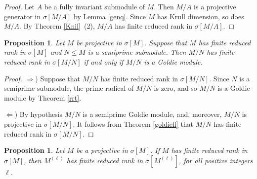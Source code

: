 \documentclass{amsart}
\newtheorem{prop}[thm]{Proposition}
\newtheorem{cor}[thm]{Corollary}
\theoremstyle{definition}
\newtheorem{example}[thm]{Example}
\theoremstyle{remark}
\numberwithin{equation}{section}
\newcommand{\sm}{\sigma[M]}
\begin{document}
	\begin{proof}
		Let $A$ be a fully invariant submodule of $M$. 
		Then $M/A$ is a projective generator in $\sigma[M/A]$ by Lemma \ref{genq}. 
		Since $M$ has Krull dimension, so does $M/A$. 
		By Theorem \ref{Knil}~(2), $M/A$ has finite reduced rank in $\sigma[M/A]$.
	\end{proof}
	
	
	
	
	\begin{prop}\label{rrq}
		Let $M$ be projective in $\sm$. 
		Suppose that $M$ has finite reduced rank in $\sm$ 
		and $N\leq M$ is a semiprime submodule. 
		Then $M/N$ has finite reduced rank in $\sigma[M/N]$ 
		if and only if $M/N$ is a Goldie module.
	\end{prop}
	
	\begin{proof}
		$\Rightarrow$) 
		Suppose that $M/N$ has finite reduced rank in $\sigma[M/N]$. 
		Since $N$ is a semiprime submodule, 
		the prime radical of $M/N$ is zero, 
		and so $M/N$ is a Goldie module by Theorem \ref{rrt}. 
		
		$\Leftarrow$) 
		By hypothesis $M/N$ is a semiprime Goldie module, 
		and, moreover, $M/N$ is projective in $\sigma[M/N]$. 
		It follows from Theorem \ref{goldiefl} that
		$M/N$ has finite reduced rank in $\sigma[M/N]$. 
	\end{proof}
	
	

	
	\begin{prop}
		\label{rrs}
		Let $M$ be a projective in $\sm$. 
		If $M$ has finite reduced rank in $\sm$, 
		then $M^{(\ell)}$ has finite reduced rank in $\sigma[M^{(\ell)}]$, 
		for all positive integers $\ell$.
	\end{prop}
	
\end{document}

